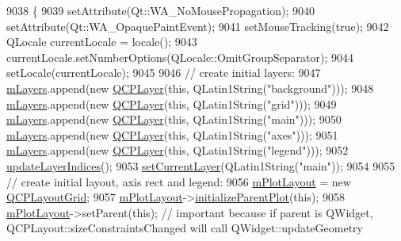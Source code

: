 \begin{DoxyCode}
9038 \{
9039   setAttribute(Qt::WA\_NoMousePropagation);
9040   setAttribute(Qt::WA\_OpaquePaintEvent);
9041   setMouseTracking(\textcolor{keyword}{true});
9042   QLocale currentLocale = locale();
9043   currentLocale.setNumberOptions(QLocale::OmitGroupSeparator);
9044   setLocale(currentLocale);
9045   
9046   \textcolor{comment}{// create initial layers:}
9047   \hyperlink{class_q_custom_plot_a72ee313041b873d76c198793ce7e6c37}{mLayers}.append(\textcolor{keyword}{new} \hyperlink{class_q_custom_plot_a5dbf96bf7664c1b6fce49063eeea6eef}{QCPLayer}(\textcolor{keyword}{this}, QLatin1String(\textcolor{stringliteral}{"background"})));
9048   \hyperlink{class_q_custom_plot_a72ee313041b873d76c198793ce7e6c37}{mLayers}.append(\textcolor{keyword}{new} \hyperlink{class_q_custom_plot_a5dbf96bf7664c1b6fce49063eeea6eef}{QCPLayer}(\textcolor{keyword}{this}, QLatin1String(\textcolor{stringliteral}{"grid"})));
9049   \hyperlink{class_q_custom_plot_a72ee313041b873d76c198793ce7e6c37}{mLayers}.append(\textcolor{keyword}{new} \hyperlink{class_q_custom_plot_a5dbf96bf7664c1b6fce49063eeea6eef}{QCPLayer}(\textcolor{keyword}{this}, QLatin1String(\textcolor{stringliteral}{"main"})));
9050   \hyperlink{class_q_custom_plot_a72ee313041b873d76c198793ce7e6c37}{mLayers}.append(\textcolor{keyword}{new} \hyperlink{class_q_custom_plot_a5dbf96bf7664c1b6fce49063eeea6eef}{QCPLayer}(\textcolor{keyword}{this}, QLatin1String(\textcolor{stringliteral}{"axes"})));
9051   \hyperlink{class_q_custom_plot_a72ee313041b873d76c198793ce7e6c37}{mLayers}.append(\textcolor{keyword}{new} \hyperlink{class_q_custom_plot_a5dbf96bf7664c1b6fce49063eeea6eef}{QCPLayer}(\textcolor{keyword}{this}, QLatin1String(\textcolor{stringliteral}{"legend"})));
9052   \hyperlink{class_q_custom_plot_a3117754df3a5638787a6223c7147970f}{updateLayerIndices}();
9053   \hyperlink{class_q_custom_plot_a73a6dc47c653bb6f8f030abca5a11852}{setCurrentLayer}(QLatin1String(\textcolor{stringliteral}{"main"}));
9054   
9055   \textcolor{comment}{// create initial layout, axis rect and legend:}
9056   \hyperlink{class_q_custom_plot_ac97298756882a0eecd98151679850ac1}{mPlotLayout} = \textcolor{keyword}{new} \hyperlink{class_q_c_p_layout_grid}{QCPLayoutGrid};
9057   \hyperlink{class_q_custom_plot_ac97298756882a0eecd98151679850ac1}{mPlotLayout}->\hyperlink{class_q_c_p_layerable_a8cbe5a0c9a5674249982f5ca5f8e02bc}{initializeParentPlot}(\textcolor{keyword}{this});
9058   \hyperlink{class_q_custom_plot_ac97298756882a0eecd98151679850ac1}{mPlotLayout}->setParent(\textcolor{keyword}{this}); \textcolor{comment}{// important because if parent is QWidget,
       QCPLayout::sizeConstraintsChanged will call QWidget::updateGeometry}

\end{DoxyCode}
